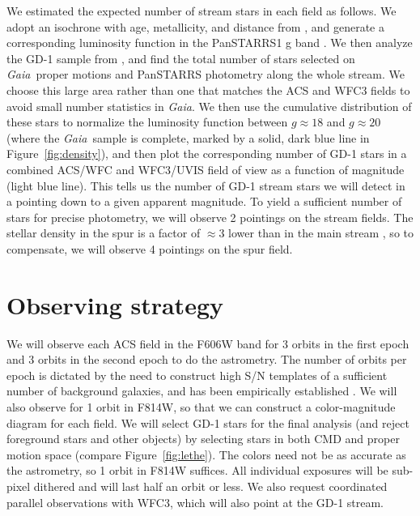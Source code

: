 \documentclass[12pt]{article}
\newcommand{\gaia}{\textsl{Gaia}}
\begin{document}
We estimated the expected number of stream stars in each field as follows.
We adopt an isochrone with age, metallicity, and distance from \textcite{koposov2010}, and generate a corresponding luminosity function in the PanSTARRS1 g band \parencite[Figure~\ref{fig:density},][]{dotter2008}.
We then analyze the GD-1 sample from \textcite{pwb2018}, and find the total number of stars selected on \gaia\ proper motions and PanSTARRS photometry along the whole stream.
We choose this large area rather than one that matches the ACS and WFC3 fields to avoid small number statistics in \gaia.
We then use the cumulative distribution of these stars to normalize the luminosity function between $g\approx18$ and $g\approx20$ (where the \gaia\ sample is complete, marked by a solid, dark blue line in Figure~\ref{fig:density}), and then plot the corresponding number of GD-1 stars in a combined ACS/WFC and WFC3/UVIS field of view as a function of magnitude (light blue line).
This tells us the number of GD-1 stream stars we will detect in a pointing down to a given apparent magnitude.
To yield a sufficient number of stars for precise photometry, we will observe 2 pointings on the stream fields.
The stellar density in the spur is a factor of $\approx3$ lower than in the main stream \parencite[compare Figure~5 in][]{pwb2018}, so to compensate, we will observe 4 pointings on the spur field.

\section*{Observing strategy}
We will observe each ACS field in the F606W band for 3 orbits in the first epoch and 3 orbits in the second epoch to do the astrometry.
The number of orbits per epoch is dictated by the need to construct high S/N templates of a sufficient number of background galaxies, and has been empirically established \parencite[e.g.,][]{sohn2012}. 
We will also observe for 1 orbit in F814W, so that we can construct a color-magnitude diagram for each field.
We will select GD-1 stars for the final analysis (and reject foreground stars and other objects) by selecting stars in both CMD and proper motion space (compare Figure~\ref{fig:lethe}).
The colors need not be as accurate as the astrometry, so 1 orbit in F814W suffices.
All individual exposures will be sub-pixel dithered and will last half an orbit or less.
We also request coordinated parallel observations with WFC3, which will also point at the GD-1 stream.
\end{document}

